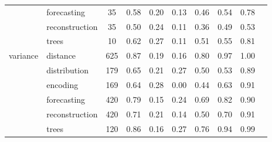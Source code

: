 \begin{tabular}{|l|l|c|c|c|c|c|c|c|c|}
 & forecasting & 35 & 0.58 & 0.20 & 0.13 & 0.46 & 0.54 & 0.78 \\
 & reconstruction & 35 & 0.50 & 0.24 & 0.11 & 0.36 & 0.49 & 0.53 \\
 & trees & 10 & 0.62 & 0.27 & 0.11 & 0.51 & 0.55 & 0.81 \\
\cline{1-9}
\multirow[t]{6}{*}{variance} & distance & 625 & 0.87 & 0.19 & 0.16 & 0.80 & 0.97 & 1.00 \\
 & distribution & 179 & 0.65 & 0.21 & 0.27 & 0.50 & 0.53 & 0.89 \\
 & encoding & 169 & 0.64 & 0.28 & 0.00 & 0.44 & 0.63 & 0.91 \\
 & forecasting & 420 & 0.79 & 0.15 & 0.24 & 0.69 & 0.82 & 0.90 \\
 & reconstruction & 420 & 0.71 & 0.21 & 0.14 & 0.50 & 0.70 & 0.91 \\
 & trees & 120 & 0.86 & 0.16 & 0.27 & 0.76 & 0.94 & 0.99 \\
\cline{1-9}
\bottomrule
\end{tabular}
